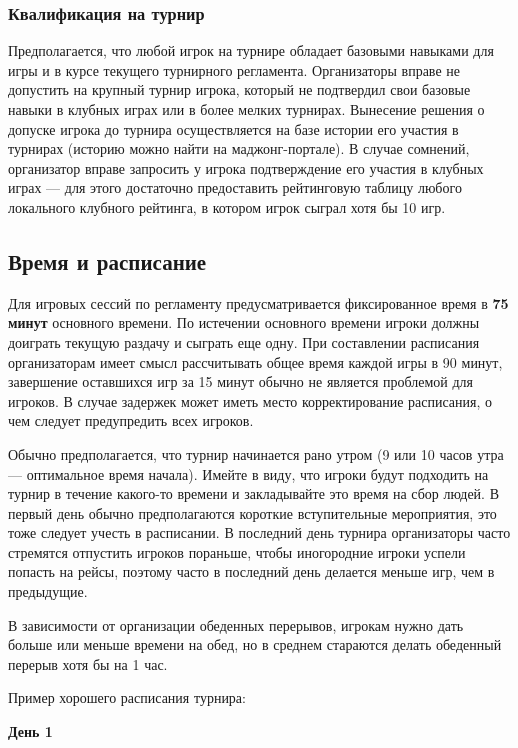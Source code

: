 \subsubsection{Квалификация на турнир}

Предполагается, что любой игрок на турнире обладает базовыми навыками для игры и в курсе текущего турнирного регламента. Организаторы вправе не допустить на крупный турнир игрока, который не подтвердил свои базовые навыки в клубных играх или в более мелких турнирах. Вынесение решения о допуске игрока до турнира осуществляется на базе истории его участия в турнирах (историю можно найти на маджонг-портале). В случае сомнений, организатор вправе запросить у игрока подтверждение его участия в клубных играх --- для этого достаточно предоставить рейтинговую таблицу любого локального клубного рейтинга, в котором игрок сыграл хотя бы 10 игр.

\subsection{Время и расписание}

Для игровых сессий по регламенту предусматривается фиксированное время в \textbf{75 минут} основного времени. По истечении основного времени игроки должны доиграть текущую раздачу и сыграть еще одну. При составлении расписания организаторам имеет смысл рассчитывать общее время каждой игры в 90 минут, завершение оставшихся игр за 15 минут обычно не является проблемой для игроков. В случае задержек может иметь место корректирование расписания, о чем следует предупредить всех игроков.

Обычно предполагается, что турнир начинается рано утром (9 или 10 часов утра --- оптимальное время начала). Имейте в виду, что игроки будут подходить на турнир в течение какого-то времени и закладывайте это время на сбор людей. В первый день обычно предполагаются короткие вступительные мероприятия, это тоже следует учесть в расписании. В последний день турнира организаторы часто стремятся отпустить игроков пораньше, чтобы иногородние игроки успели попасть на рейсы, поэтому часто в последний день делается меньше игр, чем в предыдущие.

В зависимости от организации обеденных перерывов, игрокам нужно дать больше или меньше времени на обед, но в среднем стараются делать обеденный перерыв хотя бы на 1 час.

Пример хорошего расписания турнира:

\textbf{День 1}


